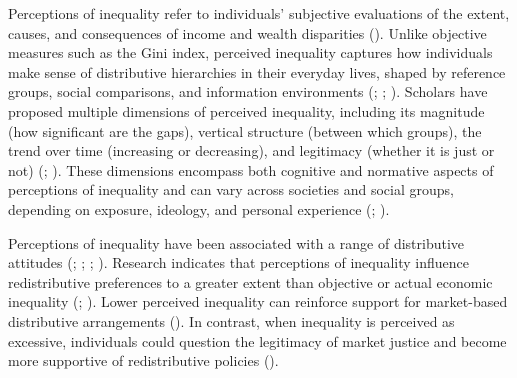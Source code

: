 \documentclass[
  12pt,
]{article}
\begin{document}
Perceptions of inequality refer to individuals' subjective evaluations
of the extent, causes, and consequences of income and wealth disparities
(). Unlike objective
measures such as the Gini index, perceived inequality captures how
individuals make sense of distributive hierarchies in their everyday
lives, shaped by reference groups, social comparisons, and information
environments (; ; ).
Scholars have proposed multiple dimensions of perceived inequality,
including its magnitude (how significant are the gaps), vertical
structure (between which groups), the trend over time (increasing or
decreasing), and legitimacy (whether it is just or not)
(;
). These dimensions encompass both cognitive and normative aspects
of perceptions of inequality and can vary across societies and social
groups, depending on exposure, ideology, and personal experience
(;
).

Perceptions of inequality have been associated with a range of
distributive attitudes (; ; ;
). Research indicates that
perceptions of inequality influence redistributive preferences to a
greater extent than objective or actual economic inequality
(;
). Lower perceived inequality can reinforce support for
market-based distributive arrangements
(). In contrast, when inequality
is perceived as excessive, individuals could question the legitimacy of
market justice and become more supportive of redistributive policies
().
\end{document}
